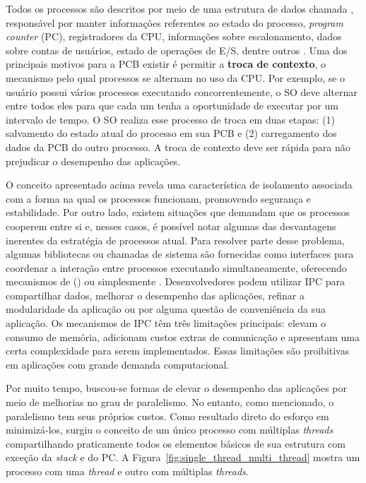 Todos os processos são descritos por meio de uma estrutura de dados chamada
, responsável por manter informações
referentes ao estado do processo, \emph{program counter} (PC), registradores da
CPU, informações sobre escalonamento, dados sobre contas de usuários, estado de
operações de E/S, dentre outros \citep{silberschatz}.  Uma dos principais
motivos para a PCB existir é permitir a \textbf{troca de contexto}, o mecanismo
pelo qual processos se alternam no uso da CPU.  Por exemplo, se o usuário
possui vários processos executando concorrentemente, o SO deve alternar entre todos
eles para que cada um tenha a oportunidade de executar por um intervalo de
tempo. O SO realiza esse processo de troca em duas etapas: (1) salvamento do
estado atual do processo em sua PCB e (2) carregamento dos dados da PCB do
outro processo. A troca de contexto deve ser rápida para não prejudicar o desempenho das aplicações.

O conceito apresentado acima revela uma característica de isolamento associada
com a forma na qual os processos funcionam, promovendo segurança e
estabilidade.  Por outro lado, existem situações que demandam que os processos
cooperem entre si e, nesses casos, é possível notar algumas das desvantagens
inerentes da estratégia de processos atual. Para resolver parte desse problema,
algumas bibliotecas ou chamadas de sistema são fornecidas como interfaces para
coordenar a interação entre processos executando simultaneamente, oferecendo
mecanismos de 
() ou simplesmente .
Desenvolvedores podem utilizar IPC para compartilhar dados, melhorar o
desempenho das aplicações, refinar a modularidade da aplicação ou por alguma
questão de conveniência da sua aplicação. Os mecanismos de IPC têm três
limitações principais: elevam o consumo de memória, adicionam custos extras de
comunicação e apresentam uma certa complexidade para serem implementados. Essas
limitações são proibitivas em aplicações com grande demanda computacional.

Por muito tempo, buscou-se formas de elevar o desempenho das
aplicações por meio de melhorias no grau de paralelismo. No entanto, como
mencionado, o paralelismo tem seus próprios custos. Como resultado direto
do esforço em minimizá-los,
surgiu o conceito de um único processo com múltiplas \emph{threads}
compartilhando praticamente todos os elementos básicos de sua estrutura com exceção da
\emph{stack} e do PC. A Figura~\ref{fig:single_thread_multi_thread} mostra um
processo com uma \emph{thread} e outro com múltiplas \emph{threads}.

